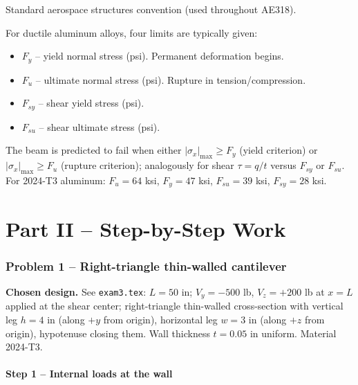 \documentclass[11pt]{article}
\begin{document}
\begin{citebox}{Standard aerospace structures convention (used throughout AE318).}
\end{citebox}

For ductile aluminum alloys, four limits are typically given:
\begin{itemize}[leftmargin=2em, itemsep=1pt]
  \item $F_y$ -- yield normal stress (psi). Permanent deformation begins.
  \item $F_u$ -- ultimate normal stress (psi). Rupture in tension/compression.
  \item $F_{sy}$ -- shear yield stress (psi).
  \item $F_{su}$ -- shear ultimate stress (psi).
\end{itemize}
The beam is predicted to fail when either $|\sigma_x|_{\max} \geq F_y$ (yield criterion) or $|\sigma_x|_{\max} \geq F_u$ (rupture criterion); analogously for shear $\tau = q/t$ versus $F_{sy}$ or $F_{su}$. For 2024-T3 aluminum: $F_u = 64$ ksi, $F_y = 47$ ksi, $F_{su} = 39$ ksi, $F_{sy} = 28$ ksi.

\part*{Part II -- Step-by-Step Work}

\section{Problem 1 -- Right-triangle thin-walled cantilever}

\textbf{Chosen design.} See \texttt{exam3.tex}: $L = 50$ in; $V_y = -500$ lb, $V_z = +200$ lb at $x = L$ applied at the shear center; right-triangle thin-walled cross-section with vertical leg $h = 4$ in (along $+y$ from origin), horizontal leg $w = 3$ in (along $+z$ from origin), hypotenuse closing them. Wall thickness $t = 0.05$ in uniform. Material 2024-T3.

\subsection*{Step 1 -- Internal loads at the wall}
\end{document}

